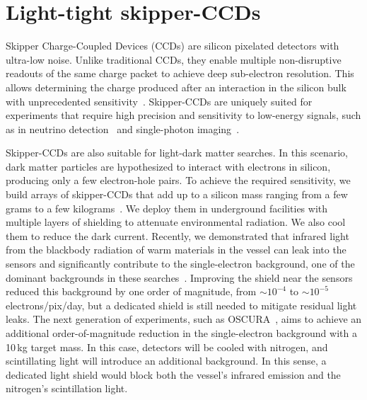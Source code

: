\documentclass[twocolumn]{aastex631}
\begin{document}
\section{Light-tight skipper-CCDs} \label{sec:intro}

Skipper Charge-Coupled Devices (CCDs) are silicon pixelated detectors with ultra-low noise. Unlike traditional CCDs, they enable multiple non-disruptive readouts of the same charge packet to achieve deep sub-electron resolution. This  allows determining the charge produced after an interaction in the silicon bulk with unprecedented sensitivity~\cite{janesick_1990,Tiffenberg:2017aac}. Skipper-CCDs are uniquely suited for experiments that require high precision and sensitivity to low-energy signals, such as in neutrino detection~\cite{Atucha} and single-photon imaging~\cite{GhostImaging,QuantumImaging}.

Skipper-CCDs are also suitable for light-dark matter searches. In this scenario, dark matter particles are hypothesized to interact with electrons in silicon, producing only a few electron-hole pairs. To achieve the required sensitivity, we build arrays of skipper-CCDs that add up to a silicon mass ranging from a few grams to a few kilograms~\cite{senseicollaboration2023sensei,2tcc-bqck,aguilar2022oscura}. We deploy them in underground facilities with multiple layers of shielding to attenuate environmental radiation. We also cool them to reduce the dark current. Recently, we demonstrated that infrared light from the blackbody radiation of warm materials in the vessel can leak into the sensors and significantly contribute to the single-electron background, one of the dominant backgrounds in these searches~\cite{sensei1epaper}. Improving the shield near the sensors reduced this background by one order of magnitude, from $\sim10^{-4}$ to $\sim10^{-5}$ electrons/pix/day, but a dedicated shield is still needed to mitigate residual light leaks. The next generation of experiments, such as OSCURA~\cite{OSCURA_Loi}, aims to achieve an additional order-of-magnitude reduction in the single-electron background with a 10\,kg target mass. In this case, detectors will be cooled with nitrogen, and scintillating light will introduce an additional background. In this sense, a dedicated light shield would block both the vessel's infrared emission and the nitrogen's scintillation light.  
\end{document}

